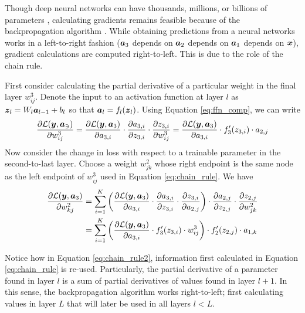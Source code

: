 Though deep neural networks can have thousands, millions, or billions of parameters \cite{gpt3}, calculating gradients remains feasible because of the backpropagation algorithm \cite{rojas1996}. While obtaining predictions from a neural networks works in a left-to-right fashion ($\boldsymbol{a}_3$ depends on $\boldsymbol{a}_2$ depends on $\boldsymbol{a}_1$ depends on $\boldsymbol{x}$), gradient calculations are computed right-to-left. This is due to the role of the chain rule.

First consider calculating the partial derivative of a particular weight in the final layer $w_{ij}^3$. Denote the input to an activation function at layer $l$ as $\boldsymbol{z}_l = W_l \boldsymbol{a}_{l-1} + b_l$ so that $\boldsymbol{a}_l = f_l(\boldsymbol{z}_l)$. Using Equation \ref{eq:ffn_comp}, we can write
\begin{equation}
  \frac{\partial \mathcal{L(\boldsymbol{y}, \boldsymbol{a}_3)}}{\partial w_{ij}^3} = \frac{\partial \mathcal{L}(\boldsymbol{y}, \boldsymbol{a}_3)}{\partial a_{3,i}} \cdot \frac{\partial a_{3,i}}{\partial z_{3,i}} \cdot \frac{\partial z_{3,i}}{\partial w_{ij}^3} = \frac{\partial \mathcal{L}(\boldsymbol{y}, \boldsymbol{a}_3)}{\partial a_{3,i}} \cdot f_3'(z_{3,i}) \cdot a_{2,j} 
  \label{eq:chain_rule}
\end{equation}
Now consider the change in loss with respect to a trainable parameter in the second-to-last layer. Choose a weight $w_{jk}^2$ whose right endpoint is the same node as the left endpoint of $w_{ij}^3$ used in Equation \ref{eq:chain_rule}. We have
\begin{equation}
  \begin{split}
    \frac{\partial \mathcal{L}(\boldsymbol{y}, \boldsymbol{a}_3)}{\partial w_{kj}^2} &= \sum_{i=1}^K \left(\frac{\partial \mathcal{L}(\boldsymbol{y}, \boldsymbol{a}_3)}{\partial a_{3,i}} \cdot \frac{\partial a_{3,i}}{\partial z_{3,i}} \cdot \frac{\partial z_{3,i}}{\partial a_{2,j}}\right) \cdot \frac{\partial a_{2,j}}{\partial z_{2,j}} \cdot \frac{\partial z_{2,j}}{\partial w_{jk}^2} \\
    &= \sum_{i=1}^K \left(\frac{\partial \mathcal{L}(\boldsymbol{y}, \boldsymbol{a}_3)}{\partial a_{3,i}} \cdot f_3'(z_{3,i}) \cdot w_{ij}^3 \right) \cdot f_2'(z_{2,j}) \cdot a_{1,k}
\end{split}
  \label{eq:chain_rule2}
\end{equation}

Notice how in Equation \ref{eq:chain_rule2}, information first calculated in Equation \ref{eq:chain_rule} is re-used. Particularly, the partial derivative of a parameter found in layer $l$ is a sum of partial derivatives of values found in layer $l+1$. In this sense, the backpropagation algorithm works right-to-left; first calculating values in layer $L$ that will later be used in all layers $l<L$.

